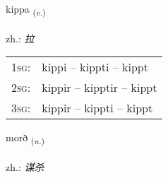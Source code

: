 \documentclass[frontgrid, backgrid]{flacards}\usepackage[]{graphicx}\usepackage[]{xcolor}
\begin{document}
\renewcommand{\flhead}{\vskip5pt \fboxsep=0pt {\small\bfseries\footnotesize Sagnorð | 动词}}
\renewcommand{\fcfoot}{\vskip5pt \fboxsep=0pt \hspace{2pt}{\small\bfseries\footnotesize 3K}}

\renewcommand{\blhead}{\vskip5pt {\small\bfseries\footnotesize Sagnorð | 动词 }}
\renewcommand{\bcfoot}{\vskip5pt \hspace{2pt}{\small\bfseries\footnotesize 3K}}


{kippa \small{\textsubscript{(\textit{v.})}} \\[1ex] %
\textphonetic{[cʰɪhpa]} \\
zh.: \emph{拉} \\  [2ex]
\renewcommand*{\arraystretch}{0.8}
\begin{tabular}{p{1cm}l}
\textsc{1sg}: & kippi -- kippti -- kippt \\ 
\textsc{2sg}: & kippir -- kipptir -- kippt \\ 
\textsc{3sg}: & kippir -- kippti -- kippt \\ 
\end{tabular}
}

\renewcommand{\flhead}{\vskip5pt \fboxsep=0pt {\small\bfseries\footnotesize Nafnorð | 名词}}
\renewcommand{\fcfoot}{\vskip5pt \fboxsep=0pt \hspace{2pt}{\small\bfseries\footnotesize 3K}}

\renewcommand{\blhead}{\vskip5pt {\small\bfseries\footnotesize Nafnorð | 名词 }}
\renewcommand{\bcfoot}{\vskip5pt \hspace{2pt}{\small\bfseries\footnotesize 3K}}


{morð \small{\textsubscript{(\textit{n.})}} \\[1ex] %
\textphonetic{[mɔrð]} \\
zh.: \emph{谋杀} \\  [2ex]
\renewcommand*{\arraystretch}{0.8}
}
\end{document}

